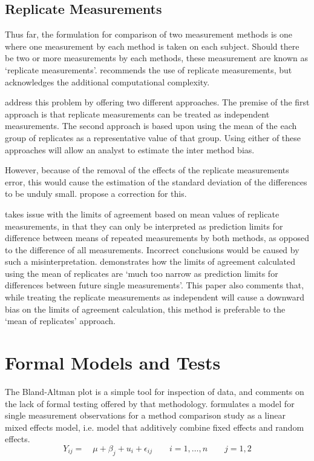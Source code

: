\documentclass[12pt, a4paper]{report}
\theoremstyle{plain}
\theoremstyle{definition}
\theoremstyle{remark}
\begin{document}
\subsection{Replicate Measurements}

Thus far, the formulation for comparison of two measurement
methods is one where one measurement by each method is taken on
each subject. Should there be two or more measurements by each
methods, these measurement are known as `replicate measurements'.
\citet{BXC2008} recommends the use of replicate measurements, but
acknowledges the additional computational complexity.

\citet*{BA86} address this problem by offering two different
approaches. The premise of the first approach is that replicate
measurements can be treated as independent measurements. The
second approach is based upon using the mean of the each group of
replicates as a representative value of that group. Using either
of these approaches will allow an analyst to estimate the inter
method bias.


However, because of the removal of the effects of the replicate
measurements error, this would cause the estimation of the
standard deviation of the differences to be unduly small.
\citet*{BA86} propose a correction for this.

\citet{BXC2008} takes issue with the limits of agreement based on
mean values of replicate measurements, in that they can only be interpreted as prediction
limits for difference between means of repeated measurements by
both methods, as opposed to the difference of all measurements.
Incorrect conclusions would be caused by such a misinterpretation.
\citet{BXC2008} demonstrates how the limits of agreement
calculated using the mean of replicates are `much too narrow as
prediction limits for differences between future single
measurements'. This paper also comments that, while treating the
replicate measurements as independent will cause a downward bias
on the limits of agreement calculation, this method is preferable
to the `mean of replicates' approach.



\newpage
\section{Formal Models and Tests}
The Bland-Altman plot is a simple tool for inspection of data, and
\citet{Kinsella} comments on the lack of formal testing offered by
that methodology. \citet{Kinsella} formulates a model for
single measurement observations for a method comparison study as a
linear mixed effects model, i.e. model that additively combine
fixed effects and random effects.
\[
Y_{ij} =\quad \mu + \beta_{j} + u_{i} + \epsilon_{ij} \qquad i = 1,\dots,n
\qquad j=1,2\]
\end{document}
